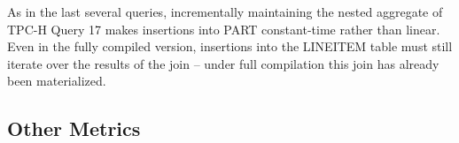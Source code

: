 As in the last several queries, incrementally maintaining the nested aggregate of TPC-H Query 17 makes insertions into PART constant-time rather than linear.  Even in the fully compiled version, insertions into the LINEITEM table must still iterate over the results of the join -- under full compilation this join has already been materialized.
%
%
%
%

\subsection{Other Metrics}
\label{sec:experiments:othermetrics}

